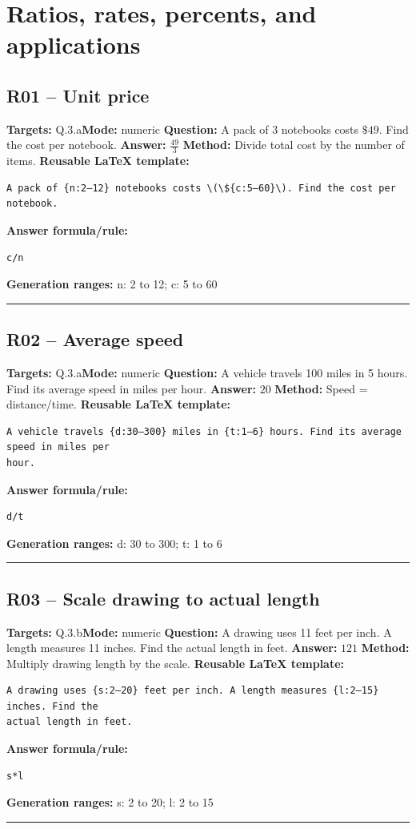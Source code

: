 \documentclass[11pt]{article}
\begin{document}
\section{Ratios, rates, percents, and applications}
\subsection{R01 -- Unit price}
\textbf{Targets:} Q.3.a\quad\textbf{Mode:} numeric
\textbf{Question:} A pack of 3 notebooks costs \(\$49\). Find the cost per notebook.
\textbf{Answer:} \(\frac{49}{3}\)
\textbf{Method:} Divide total cost by the number of items.
\textbf{Reusable LaTeX template:}
\begin{verbatim}
A pack of {n:2–12} notebooks costs \(\${c:5–60}\). Find the cost per notebook.
\end{verbatim}
\textbf{Answer formula/rule:}
\begin{verbatim}
c/n
\end{verbatim}
\textbf{Generation ranges:} n: 2 to 12; c: 5 to 60
\medskip\hrule\medskip
\subsection{R02 -- Average speed}
\textbf{Targets:} Q.3.a\quad\textbf{Mode:} numeric
\textbf{Question:} A vehicle travels 100 miles in 5 hours. Find its average speed in miles per hour.
\textbf{Answer:} \(20\)
\textbf{Method:} Speed = distance/time.
\textbf{Reusable LaTeX template:}
\begin{verbatim}
A vehicle travels {d:30–300} miles in {t:1–6} hours. Find its average speed in miles per
hour.
\end{verbatim}
\textbf{Answer formula/rule:}
\begin{verbatim}
d/t
\end{verbatim}
\textbf{Generation ranges:} d: 30 to 300; t: 1 to 6
\medskip\hrule\medskip
\subsection{R03 -- Scale drawing to actual length}
\textbf{Targets:} Q.3.b\quad\textbf{Mode:} numeric
\textbf{Question:} A drawing uses 11 feet per inch. A length measures 11 inches. Find the actual length in feet.
\textbf{Answer:} \(121\)
\textbf{Method:} Multiply drawing length by the scale.
\textbf{Reusable LaTeX template:}
\begin{verbatim}
A drawing uses {s:2–20} feet per inch. A length measures {l:2–15} inches. Find the
actual length in feet.
\end{verbatim}
\textbf{Answer formula/rule:}
\begin{verbatim}
s*l
\end{verbatim}
\textbf{Generation ranges:} s: 2 to 20; l: 2 to 15
\medskip\hrule\medskip
\end{document}
